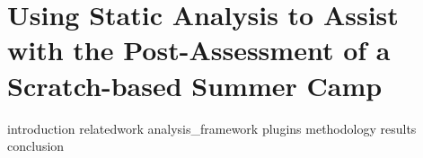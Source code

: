 \chapter{Using Static Analysis to Assist with the Post-Assessment of a
               Scratch-based Summer Camp}
\label{chap:hairball}

\def\currentprefix{hairball}

{introduction}
{relatedwork}
{analysis_framework}
{plugins}
{methodology}
{results}
{conclusion}
